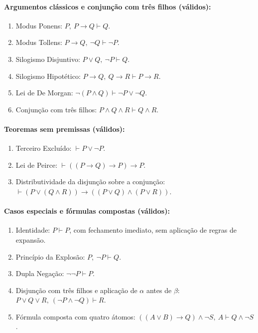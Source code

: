 \documentclass[12pt,a4paper]{article}
\begin{document}
\paragraph{Argumentos clássicos e conjunção com três filhos (válidos):}
\begin{enumerate}
    \item Modus Ponens: $P,\ P \rightarrow Q \vdash Q$.
    \item Modus Tollens: $P \rightarrow Q,\ \neg Q \vdash \neg P$.
    \item Silogismo Disjuntivo: $P \vee Q,\ \neg P \vdash Q$.
    \item Silogismo Hipotético: $P \rightarrow Q,\ Q \rightarrow R \vdash P \rightarrow R$.
    \item Lei de De Morgan: $\neg(P \wedge Q) \vdash \neg P \vee \neg Q$.
    \item Conjunção com três filhos: $P \wedge Q \wedge R \vdash Q \wedge R$.
\end{enumerate}

\paragraph{Teoremas sem premissas (válidos):}
\begin{enumerate}
    \item Terceiro Excluído: $\vdash P \vee \neg P$.
    \item Lei de Peirce: $\vdash ((P \rightarrow Q) \rightarrow P) \rightarrow P$.
    \item Distributividade da disjunção sobre a conjunção:
    $\vdash (P \vee (Q \wedge R)) \rightarrow ((P \vee Q) \wedge (P \vee R))$.
\end{enumerate}

\paragraph{Casos especiais e fórmulas compostas (válidos):}
\begin{enumerate}
    \item Identidade: $P \vdash P$, com fechamento imediato, sem aplicação de regras de expansão.
    \item Princípio da Explosão: $P,\ \neg P \vdash Q$.
    \item Dupla Negação: $\neg\neg P \vdash P$.
    \item Disjunção com três filhos e aplicação de $\alpha$ antes de $\beta$:
    $P \vee Q \vee R,\ (\neg P \wedge \neg Q) \vdash R$.
    \item Fórmula composta com quatro átomos:
    $((A \vee B) \rightarrow Q) \wedge \neg S,\ A \vdash Q \wedge \neg S$.
\end{enumerate}
\end{document}
